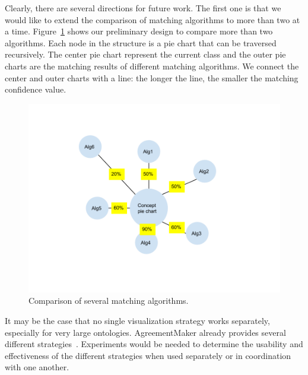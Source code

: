 Clearly, there are several directions for future work. The first one
is that we would like to extend the comparison of matching algorithms
to more than two at a time. Figure~\ref{fig:updated_structure} shows our preliminary design to
compare more than two algorithms. Each node in the structure is a
pie chart that can be traversed recursively. The center pie chart
represent the current class and the outer pie charts are the matching
results of different matching algorithms. We connect the center and
outer charts with a line: the longer the line, the smaller the matching confidence value. 

\begin{figure}[!ht]
	\centering
	\includegraphics[width=4.5in]{pics/structure.png}
	\caption{Comparison of several matching algorithms.}
	\label{fig:updated_structure}
\end{figure}

It may be the case that no single visualization strategy works
separately, especially for very large ontologies. AgreementMaker already provides several different
strategies~\cite{cruz-icde-demo,vldb2009demo}. Experiments would be needed to determine the usability and
effectiveness of
the different strategies when used separately or in coordination with
one another.



